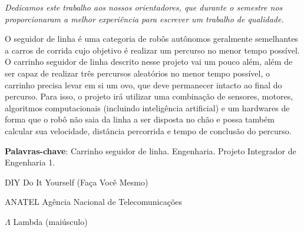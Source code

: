 \documentclass[
  12pt, %
  openright, %
  twoside, %
  a4paper, %
  english, %
  french, %
  spanish, %
  brazil %
]{abntex2}
\newcommand{\listofquadrosname}{Lista de quadros}
\begin{document}
%
%
\begin{dedicatoria}
  \vspace*{\fill}
  \centering
  \noindent
  \textit{
    Dedicamos este trabalho aos nossos orientadores, que durante o semestre nos
    proporcionaram a melhor experiência para escrever um trabalho de qualidade.
  }
  \vspace*{\fill}
\end{dedicatoria}

%
%

%
%

\setlength{\absparsep}{18pt}
\begin{resumo}
  O seguidor de linha é uma categoria de robôs autônomos geralmente semelhantes
  a carros de corrida cujo objetivo é realizar um percurso no menor tempo
  possível. O carrinho seguidor de linha descrito nesse projeto vai um pouco
  além, além de ser capaz de realizar três percursos aleatórios no menor tempo
  possível, o carrinho precisa levar em si um ovo, que deve permanecer intacto
  ao final do percurso. Para isso, o projeto irá utilizar uma combinação de
  sensores, motores, algoritmos computacionais (incluindo inteligência
  artificial) e um hardwares de forma que o robô não saia da linha a ser
  disposta no chão e possa também calcular sua velocidade, distância percorrida
  e tempo de conclusão do percurso.

  \textbf{Palavras-chave}: Carrinho seguidor de linha. Engenharia. Projeto
    Integrador de Engenharia 1.
\end{resumo}

%
%
\listoffigures*
\cleardoublepage

%
%
\pdfbookmark[0]{\listofquadrosname}{loq}
\listofquadros*
\cleardoublepage

%
%
\listoftables*
\cleardoublepage

%
%
\begin{siglas}
  \item[DIY] Do It Yourself (Faça Você Mesmo)
  \item[ANATEL] Agência Nacional de Telecomunicações
\end{siglas}

%
%
\begin{simbolos}
  \item[$ \Lambda $] Lambda (maiúsculo)
\end{simbolos}
\end{document}
